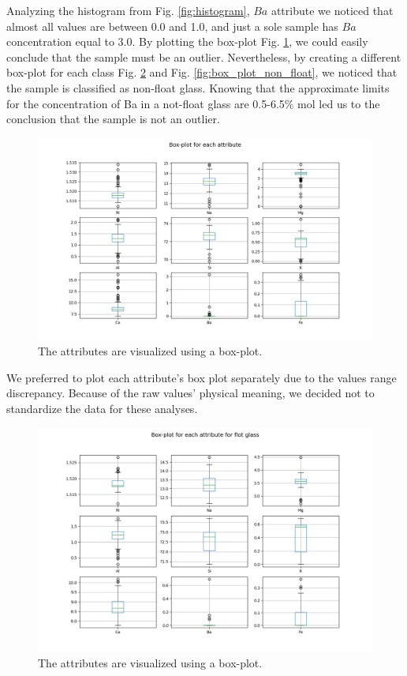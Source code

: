 \documentclass[12pt]{article}
\begin{document}
    
Analyzing the histogram from Fig. \ref{fig:histogram}, $Ba$ attribute we noticed that almost all values are between 0.0 and 1.0, and just a sole sample has $Ba$ concentration equal to 3.0. By plotting the box-plot Fig. \ref{fig:box_plot}, we could easily conclude that the sample must be an outlier. Nevertheless, by creating a different box-plot for each class Fig. \ref{fig:box_plot_float} and Fig. \ref{fig:box_plot_non_float}, we noticed that the sample is classified as non-float glass. Knowing that the approximate limits for the concentration of Ba in a not-float glass are 0.5-6.5\% mol \cite{glass_composition} led us to the conclusion that the sample is not an outlier.
    
    \begin{figure}[H]
        \centering
    	\includegraphics[width=\linewidth]{image/box-plot__for_each_attribute.png}
    	\caption{The attributes are visualized using a box-plot.}
    	\label{fig:box_plot}
    \end{figure}
We preferred to plot each attribute's box plot separately due to the values range discrepancy. Because of the raw values' physical meaning, we decided not to standardize the data for these analyses.
    
    \begin{figure}[H]
        \centering
    	\includegraphics[width=\linewidth]{image/box-plot__for_each_attribute_for_float.png}
    	\caption{The attributes are visualized using a box-plot.}
    	\label{fig:box_plot_float}
    \end{figure}
    
\end{document}
